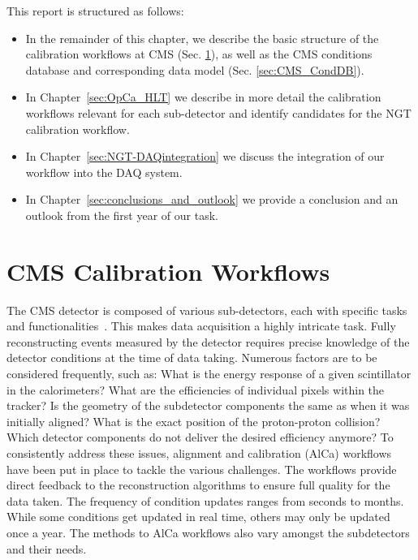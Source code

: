 This report is structured as follows:
\begin{itemize}
    \item In the remainder of this chapter, we describe the basic structure of the calibration workflows at CMS (Sec. \ref{sec:CMScalibration}), as well as the CMS conditions database and corresponding data model (Sec. \ref{sec:CMS_CondDB}).
    \item In Chapter~\ref{sec:OpCa_HLT} we describe in more detail the calibration workflows relevant for each sub-detector and identify candidates for the NGT calibration workflow.
    \item In Chapter~\ref{sec:NGT-DAQintegration} we discuss the integration of our workflow into the DAQ system.
    \item In Chapter~\ref{sec:conclusions_and_outlook} we provide a conclusion and an outlook from the first year of our task.
\end{itemize}


\section{CMS Calibration Workflows}\label{sec:CMScalibration}
The CMS detector is composed of various sub-detectors, each with specific tasks and functionalities~\cite{CMS:2008xjf,CMS:2023gfb}.
This makes data acquisition a highly intricate task. Fully reconstructing events measured by the detector requires precise knowledge of the detector conditions at the time of data taking. Numerous factors are to be considered frequently, such as: What is the energy response of a given scintillator in the calorimeters? What are the efficiencies of individual pixels within the tracker? Is the geometry of the subdetector components the same as when it was initially aligned?
What is the exact position of the proton-proton collision? Which detector components do not deliver the desired efficiency anymore? To consistently address these issues, alignment and calibration (AlCa) workflows have been put in place to tackle the various challenges. The workflows provide direct feedback to the reconstruction algorithms to ensure full quality for the data taken. The frequency of condition updates ranges from seconds to months. While some conditions get updated in real time, others may only be updated once a year. The methods to AlCa workflows also vary amongst the subdetectors and their needs.

